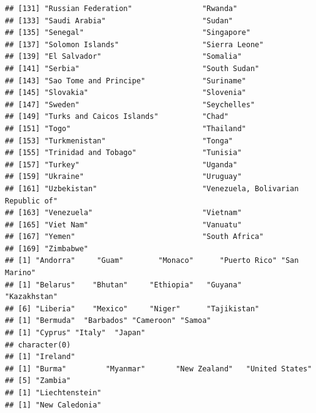 \documentclass[]{article}
\newenvironment{Shaded}{\begin{snugshade}}{\end{snugshade}}
\newcommand{\ControlFlowTok}[1]{\textcolor[rgb]{0.13,0.29,0.53}{\textbf{#1}}}
\newcommand{\DecValTok}[1]{\textcolor[rgb]{0.00,0.00,0.81}{#1}}
\newcommand{\KeywordTok}[1]{\textcolor[rgb]{0.13,0.29,0.53}{\textbf{#1}}}
\newcommand{\NormalTok}[1]{#1}
\newcommand{\OperatorTok}[1]{\textcolor[rgb]{0.81,0.36,0.00}{\textbf{#1}}}
\newcommand{\StringTok}[1]{\textcolor[rgb]{0.31,0.60,0.02}{#1}}
\begin{document}
\begin{verbatim}
## [131] "Russian Federation"                "Rwanda"                           
## [133] "Saudi Arabia"                      "Sudan"                            
## [135] "Senegal"                           "Singapore"                        
## [137] "Solomon Islands"                   "Sierra Leone"                     
## [139] "El Salvador"                       "Somalia"                          
## [141] "Serbia"                            "South Sudan"                      
## [143] "Sao Tome and Principe"             "Suriname"                         
## [145] "Slovakia"                          "Slovenia"                         
## [147] "Sweden"                            "Seychelles"                       
## [149] "Turks and Caicos Islands"          "Chad"                             
## [151] "Togo"                              "Thailand"                         
## [153] "Turkmenistan"                      "Tonga"                            
## [155] "Trinidad and Tobago"               "Tunisia"                          
## [157] "Turkey"                            "Uganda"                           
## [159] "Ukraine"                           "Uruguay"                          
## [161] "Uzbekistan"                        "Venezuela, Bolivarian Republic of"
## [163] "Venezuela"                         "Vietnam"                          
## [165] "Viet Nam"                          "Vanuatu"                          
## [167] "Yemen"                             "South Africa"                     
## [169] "Zimbabwe"                         
## [1] "Andorra"     "Guam"        "Monaco"      "Puerto Rico" "San Marino" 
## [1] "Belarus"    "Bhutan"     "Ethiopia"   "Guyana"     "Kazakhstan"
## [6] "Liberia"    "Mexico"     "Niger"      "Tajikistan"
## [1] "Bermuda"  "Barbados" "Cameroon" "Samoa"   
## [1] "Cyprus" "Italy"  "Japan" 
## character(0)
## [1] "Ireland"
## [1] "Burma"         "Myanmar"       "New Zealand"   "United States"
## [5] "Zambia"       
## [1] "Liechtenstein"
## [1] "New Caledonia"
\end{verbatim}

\begin{Shaded}
\end{Shaded}
\end{document}

